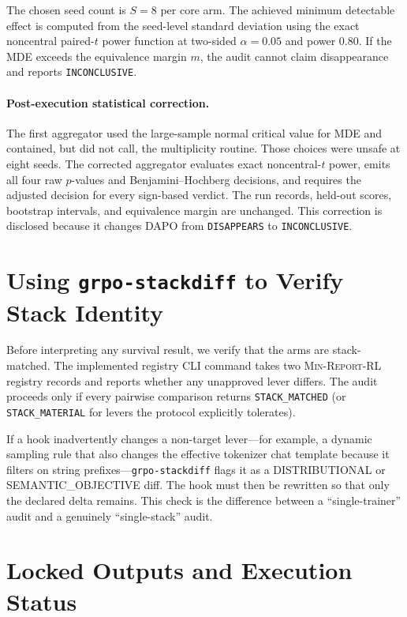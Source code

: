 \documentclass[11pt]{article}
\newcommand{\minreport}{\textsc{Min-Report-RL}}
\begin{document}
The chosen seed count is $S=8$ per core arm. The achieved minimum detectable
effect is computed from the seed-level standard deviation using the exact
noncentral paired-$t$ power function at two-sided $\alpha=0.05$ and power 0.80.
If the MDE exceeds the equivalence margin $m$, the audit cannot claim
disappearance and reports \texttt{INCONCLUSIVE}.

\paragraph{Post-execution statistical correction.} The first aggregator used
the large-sample normal critical value for MDE and contained, but did not call,
the multiplicity routine. Those choices were unsafe at eight seeds. The
corrected aggregator evaluates exact noncentral-$t$ power, emits all four raw
$p$-values and Benjamini--Hochberg decisions, and requires the adjusted decision
for every sign-based verdict. The run records, held-out scores, bootstrap
intervals, and equivalence margin are unchanged. This correction is disclosed
because it changes DAPO from \texttt{DISAPPEARS} to \texttt{INCONCLUSIVE}.

\section{Using \texttt{grpo-stackdiff} to Verify Stack Identity}
\label{sec:stackdiff}


Before interpreting any survival result, we verify that the arms are
stack-matched. The implemented registry CLI command
 \cite{minreportrl2026}
takes two \minreport{} registry records and reports
whether any unapproved lever differs. The audit proceeds only if every pairwise
comparison returns \texttt{STACK\_MATCHED} (or \texttt{STACK\_MATERIAL} for
levers the protocol explicitly tolerates).

If a hook inadvertently changes a non-target lever---for example, a dynamic
sampling rule that also changes the effective tokenizer chat template because
it filters on string prefixes---\texttt{grpo-stackdiff} flags it as a
DISTRIBUTIONAL or SEMANTIC\_OBJECTIVE diff. The hook must then be rewritten so
that only the declared delta remains. This check is the difference between a
``single-trainer'' audit and a genuinely ``single-stack'' audit.

\section{Locked Outputs and Execution Status}
\end{document}
